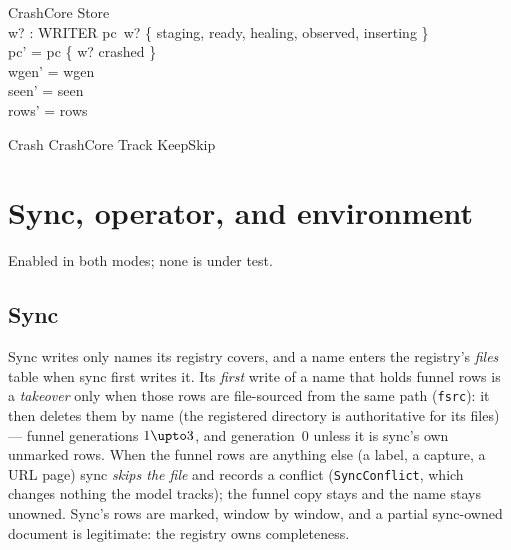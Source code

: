 \documentclass[a4paper,10pt,fleqn]{article}
\newcommand{\field}[1]{\texttt{#1}}
\begin{document}
\begin{schema}{CrashCore}
\Delta Store \\ w? : WRITER
\where
pc~w? \in \{ staging, ready, healing, observed, inserting \} \\
pc' = pc \oplus \{ w? \mapsto crashed \} \\
wgen' = wgen \\
seen' = seen \\
rows' = rows
\end{schema}

\begin{zed}
Crash  CrashCore \land Track \land KeepSkip
\end{zed}

\section{Sync, operator, and environment}
\label{sec:other}

Enabled in both modes; none is under test.

\subsection{Sync}

Sync writes only names its registry covers, and a name enters the registry's
\emph{files} table when sync first writes it. Its \emph{first} write of a name
that holds funnel rows is a \emph{takeover} only when those rows are
file-sourced from the same path (\field{fsrc}): it then deletes them by name
(the registered directory is authoritative for its files) --- funnel
generations $1\upto3$, and generation~0 unless it is sync's own unmarked rows.
When the funnel rows are anything else (a label, a capture, a URL page) sync
\emph{skips the file} and records a conflict (\field{SyncConflict}, which
changes nothing the model tracks); the funnel copy stays and the name stays
unowned. Sync's rows are marked, window by window, and a partial sync-owned
document is legitimate: the registry owns completeness.
\end{document}
